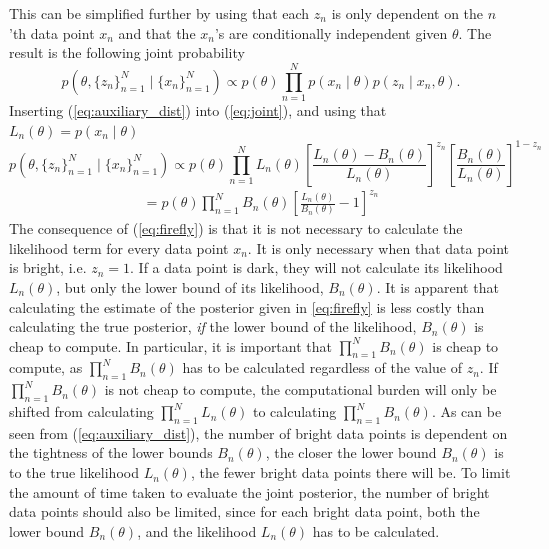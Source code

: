  This can be simplified further by using that each $z_n$ is only dependent on the $n$'th data point $x_n$ and that the $x_n$'s are conditionally independent given $\theta$. 
 The result is the following joint probability 
\begin{equation}\label{eq:joint}
           p(\theta, \{z_n\}_{n=1}^N \mid \{x_n\}_{n=1}^N) \propto p(\theta) \prod_{n=1}^N p(x_n\mid\theta)p(z_n\mid x_n, \theta).
\end{equation}
Inserting (\ref{eq:auxiliary_dist}) into (\ref{eq:joint}), and using that $L_n(\theta) = p(x_n\mid\theta)$
\begin{equation}
     p(\theta, \{z_n\}_{n=1}^N\mid\{x_n\}_{n=1}^N )\propto p(\theta) \prod_{n=1}^N L_n(\theta)\left[\frac{L_n(\theta) - B_n\left(\theta\right)}{L_n\left(\theta\right)}\right]^{z_n}\left[\frac{B_n\left(\theta\right)}{L_n\left(\theta\right)}\right]^{1-z_n} 
\end{equation}
\begin{equation}
\label{eq:firefly}
\begin{split}
     =p(\theta) \prod_{n = 1}^N
B_n\left(\theta\right) \left[\frac{L_n\left(\theta\right)}{B_n\left(\theta\right)} - 1\right]^{z_n} 
\end{split}
\end{equation}
The consequence of (\ref{eq:firefly}) is that it is not necessary to calculate the likelihood term for every data point $x_n$. 
It is only necessary when that data point is bright, i.e. $z_n = 1$. 
If a data point is dark, they will not calculate its likelihood $L_n(\theta)$, but only the lower bound of its likelihood, $B_n(\theta)$. It is apparent that calculating the estimate of the posterior given in \eqref{eq:firefly} is less costly than calculating the true posterior, \textit{if} the  lower bound of the likelihood, $B_n\left(\theta\right)$ is cheap to compute. In particular, it is important that $\prod_{n=1}^N B_n\left(\theta\right)$ is cheap to compute, as $\prod_{n=1}^N B_n\left(\theta\right)$ has to be calculated regardless of the value of $z_n$. If $\prod_{n=1}
^N B_n\left(\theta\right)$ is not cheap to compute, the computational burden will only be shifted from calculating $\prod_{n=1}^N L_n\left(\theta\right)$ to calculating $\prod_{n=1}^N B_n\left(\theta\right)$.  
As can be seen from (\ref{eq:auxiliary_dist}), the number of bright data points is dependent on the tightness of the lower bounds $B_n(\theta)$, the closer the lower bound $B_n\left(\theta\right)$ is to the true likelihood $L_n\left(\theta\right)$, the fewer bright data points there will be.  
To limit the amount of time taken to evaluate the joint posterior, the number of bright data points should also be limited, since for each bright data point, both the lower bound $B_n\left(\theta\right)$, and the likelihood $L_n\left(\theta\right)$ has to be calculated.

